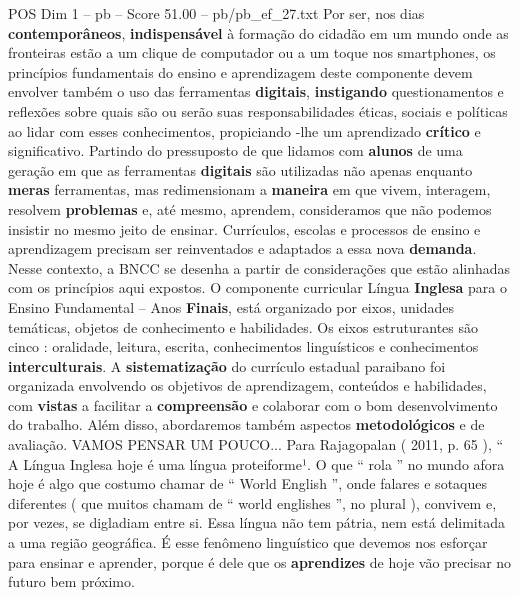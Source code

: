 \begin{textsample}{POS Dim 1 – pb – Score 51.00 – pb/pb\_ef\_27.txt}
Por ser, nos dias \textbf{contemporâneos}, \textbf{indispensável} à formação do cidadão em um mundo onde as fronteiras estão a um clique de computador ou a um toque nos smartphones, os princípios fundamentais do ensino e aprendizagem deste componente devem envolver também o uso das ferramentas \textbf{digitais}, \textbf{instigando} questionamentos e reflexões sobre quais são ou serão suas responsabilidades éticas, sociais e políticas ao lidar com esses conhecimentos, propiciando -lhe um aprendizado \textbf{crítico} e significativo.
Partindo do pressuposto de que lidamos com \textbf{alunos} de uma geração em que as ferramentas \textbf{digitais} são utilizadas não apenas enquanto \textbf{meras} ferramentas, mas redimensionam a \textbf{maneira} em que vivem, interagem, resolvem \textbf{problemas} e, até mesmo, aprendem, consideramos que não podemos insistir no mesmo jeito de ensinar.
Currículos, escolas e processos de ensino e aprendizagem precisam ser reinventados e adaptados a essa nova \textbf{demanda}.
Nesse contexto, a BNCC se desenha a partir de considerações que estão alinhadas com os princípios aqui expostos.
O componente curricular Língua \textbf{Inglesa} para o Ensino Fundamental – Anos \textbf{Finais}, está organizado por eixos, unidades temáticas, objetos de conhecimento e habilidades.
Os eixos estruturantes são cinco : oralidade, leitura, escrita, conhecimentos linguísticos e conhecimentos \textbf{interculturais}.
A \textbf{sistematização} do currículo estadual paraibano foi organizada envolvendo os objetivos de aprendizagem, conteúdos e habilidades, com \textbf{vistas} a facilitar a \textbf{compreensão} e colaborar com o bom desenvolvimento do trabalho.
Além disso, abordaremos também aspectos \textbf{metodológicos} e de avaliação.
VAMOS PENSAR UM POUCO...
Para Rajagopalan ( 2011, p. 65 ), “ A Língua Inglesa hoje é uma língua proteiforme¹.
O que “ rola ” no mundo afora hoje é algo que costumo chamar de “ World English ”, onde falares e sotaques diferentes ( que muitos chamam de “ world englishes ”, no plural ), convivem e, por vezes, se digladiam entre si.
Essa língua não tem pátria, nem está delimitada a uma região geográfica.
É esse fenômeno linguístico que devemos nos esforçar para ensinar e aprender, porque é dele que os \textbf{aprendizes} de hoje vão precisar no futuro bem próximo.

\end{textsample}
